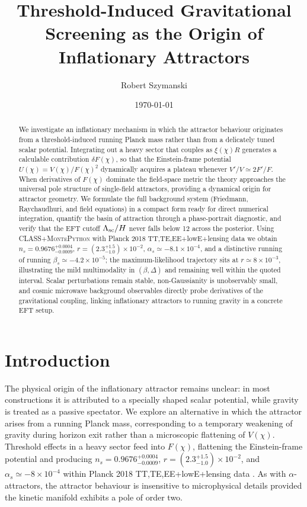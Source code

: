 \documentclass[11pt,a4paper]{article}
\title{Threshold-Induced Gravitational Screening as the Origin of Inflationary Attractors}
\author{Robert Szymanski}
\date{\today}
\begin{document}
\maketitle

\begin{abstract}
We investigate an inflationary mechanism in which the attractor behaviour originates from a threshold-induced running Planck mass rather than from a delicately tuned scalar potential. Integrating out a heavy sector that couples as $\xi(\chi) R$ generates a calculable contribution $\delta F(\chi)$, so that the Einstein-frame potential $U(\chi)=V(\chi)/F(\chi)^2$ dynamically acquires a plateau whenever $V'/V\simeq2F'/F$. When derivatives of $F(\chi)$ dominate the field-space metric the theory approaches the universal pole structure of single-field attractors, providing a dynamical origin for attractor geometry. We formulate the full background system (Friedmann, Raychaudhuri, and field equations) in a compact form ready for direct numerical integration, quantify the basin of attraction through a phase-portrait diagnostic, and verify that the EFT cutoff $\Lambda_{\rm sc}/H$ never falls below 12 across the posterior. Using \textsc{CLASS}+\textsc{MontePython} with Planck 2018 TT,TE,EE+lowE+lensing data we obtain $n_s=0.9676^{+0.0004}_{-0.0009}$, $r=(2.3^{+1.5}_{-1.0})\times10^{-2}$, $\alpha_s\simeq-8.1\times10^{-4}$, and a distinctive running of running $\beta_s\simeq-4.2\times10^{-5}$; the maximum-likelihood trajectory sits at $r\simeq8\times10^{-3}$, illustrating the mild multimodality in $(\beta,\Delta)$ and remaining well within the quoted interval. Scalar perturbations remain stable, non-Gaussianity is unobservably small, and cosmic microwave background observables directly probe derivatives of the gravitational coupling, linking inflationary attractors to running gravity in a concrete EFT setup.
\end{abstract}

\section{Introduction}
\label{sec:intro}
The physical origin of the inflationary attractor remains unclear: in most constructions it is attributed to a specially shaped scalar potential, while gravity is treated as a passive spectator. We explore an alternative in which the attractor arises from a running Planck mass, corresponding to a temporary weakening of gravity during horizon exit rather than a microscopic flattening of $V(\chi)$. Threshold effects in a heavy sector feed into $F(\chi)$, flattening the Einstein-frame potential and producing $n_s=0.9676^{+0.0004}_{-0.0009}$, $r=(2.3^{+1.5}_{-1.0})\times10^{-2}$, and $\alpha_s\simeq-8\times10^{-4}$ within Planck 2018 TT,TE,EE+lowE+lensing data \cite{Planck2018}. As with $\alpha$-attractors, the attractor behaviour is insensitive to microphysical details provided the kinetic manifold exhibits a pole of order two.
\end{document}
